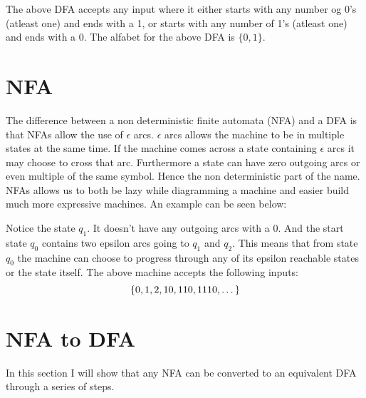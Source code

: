 The above DFA accepts any input where it either starts with any number og 0's (atleast one) and ends with a 1, or starts with any number of 1's (atleast one) and ends with a 0. The alfabet for the above DFA is $\{0, 1\}$.

\section{NFA}

The difference between a non deterministic finite automata (NFA) and a DFA is that NFAs allow the use of $\epsilon$ arcs. $\epsilon$ arcs allows the machine to be in multiple states at the same time. If the machine comes across a state containing $\epsilon$ arcs it may choose to cross that arc. Furthermore a state can have zero outgoing arcs or even multiple of the same symbol. Hence the non deterministic part of the name. NFAs allows us to both be lazy while diagramming a machine and easier build much more expressive machines. An example can be seen below:


\begin{center}
\end{center}

Notice the state $q_1$. It doesn't have any outgoing arcs with a $0$. And the start state $q_0$ contains two epsilon arcs going to $q_1$ and $q_2$. This means that from state $q_0$ the machine can choose to progress through any of its epsilon reachable states or the state itself. The above machine accepts the following inputs:
\[\left\{0, 1, 2, 10, 110, 1110, \dots\right\}\]

\section{NFA to DFA}

In this section I will show that any NFA can be converted to an equivalent DFA through a series of steps. 

